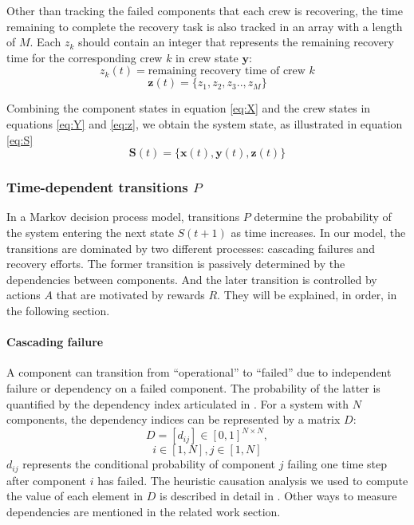 \documentclass[conference]{IEEEtran}
\begin{document}
Other than tracking the failed components that each crew is recovering, the time remaining to complete the recovery task is also tracked in an array with a length of $M$. Each $z_k$ should contain an integer that represents the remaining recovery time for the corresponding crew $k$ in crew state $\mathbf{y}$:
$$z_k (t)= \text{remaining recovery time of crew } k$$
\begin{equation}
    \mathbf{z}(t) = \{z_1, z_2, z_3 .., z_M\}
    \label{eq:z}
\end{equation}


Combining the component states in equation \ref{eq:X} and the crew states in equations \ref{eq:Y} and \ref{eq:z}, we obtain the system state, as illustrated in equation \ref{eq:S}
\begin{equation}
    \mathbf{S}(t) = \{\mathbf{x}(t),\mathbf{y}(t), \mathbf{z}(t) \}
    \label{eq:S}
\end{equation}

\subsubsection{Time-dependent transitions \texorpdfstring{$P$}{P} }
In a Markov decision process model, transitions $P$ determine the probability of the system entering the next state $S(t+1)$ as time increases. In our model, the transitions are dominated by two different processes: cascading failures and recovery efforts. The former transition is passively determined by the dependencies between components. And the later transition is controlled by actions $A$ that are motivated by rewards $R$. They will be explained, in order, in the following section. 

\paragraph{Cascading failure} 
A component can transition from ``operational''  to  ``failed'' due to independent failure or dependency on a failed component. The probability of the latter is quantified by the dependency index articulated in \cite{redacted}. For a system with $N$ components, the dependency indices can be represented by a matrix $D$:
\begin{equation}
D=[d_{ij} ] \in [0,1]^{N \times N},  
\end{equation}
$$i \in [1, N], j \in [1, N]$$
$d_{ij}$ represents the conditional probability of component $j$ failing one time step after component $i$ has failed. The heuristic causation analysis we used to compute the value of each element in $D$ is described in detail in  \cite{redacted}. Other ways to measure dependencies are mentioned in the related work section.%
\end{document}
